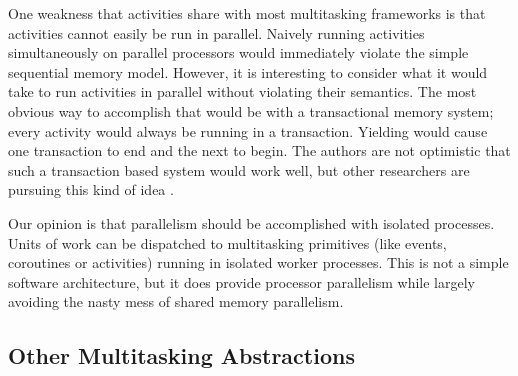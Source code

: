 \documentclass[9pt,preprint]{sigplanconf}
\begin{document}
One weakness that activities share with most multitasking frameworks is that activities cannot easily be run in parallel.
Naively running activities simultaneously on parallel processors would immediately violate the simple sequential memory model.
However, it is interesting to consider what it would take to run activities in parallel without violating their semantics.
The most obvious way to accomplish that would be with a transactional memory system; every activity would always be running in a transaction.
Yielding would cause one transaction to end and the next to begin.
The authors are not optimistic that such a transaction based system would work well, but other researchers are pursuing this kind of idea \cite{ONeill2015, Boussinot2006, Dabrowski2006}.

Our opinion is that parallelism should be accomplished with isolated processes.
Units of work can be dispatched to multitasking primitives (like events, coroutines or activities) running in isolated worker processes.
This is not a simple software architecture, but it does provide processor parallelism while largely avoiding the nasty mess of shared memory parallelism.






\subsection{Other Multitasking Abstractions}
\end{document}
